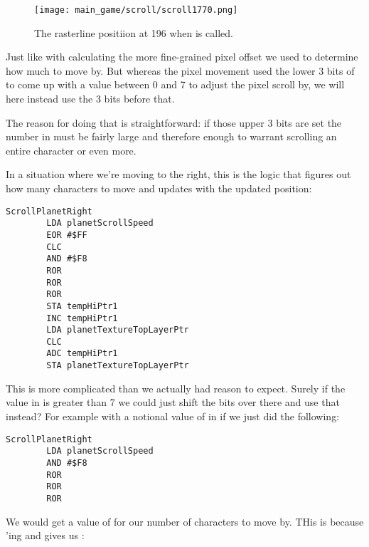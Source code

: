 \begin{figure}[H]
    \centering
      \texttt{[image: main\_game/scroll/scroll1770.png]}%
\caption{The rasterline positiion at 196 when  is called.}
\end{figure}

Just like with calculating the more fine-grained pixel offset we used  to determine
how much to move by. But whereas the pixel movement used the lower 3 bits of  to come
up with a value between 0 and 7 to adjust the pixel scroll by, we will here instead use the 3 bits before that.

The reason for doing that is straightforward: if those upper 3 bits are set the number in 
must be fairly large and therefore enough to warrant scrolling an entire character or even more.

In a situation where we're moving to the right, this is the logic that figures out how many characters to move and
updates  with the updated position:

\begin{lstlisting}
ScrollPlanetRight   
        LDA planetScrollSpeed
        EOR #$FF
        CLC
        AND #$F8
        ROR
        ROR
        ROR
        STA tempHiPtr1
        INC tempHiPtr1
        LDA planetTextureTopLayerPtr
        CLC
        ADC tempHiPtr1
        STA planetTextureTopLayerPtr
\end{lstlisting}

This is more complicated than we actually had reason to expect. Surely if the value in  is
greater than 7 we could just shift the bits over there and use that instead? For example with a notional value of
 in  if we just did the following:

\begin{lstlisting}
ScrollPlanetRight   
        LDA planetScrollSpeed
        AND #$F8
        ROR
        ROR
        ROR
\end{lstlisting}

We would get a value of  for our number of characters to move by. THis is because 'ing
 and  gives us :


